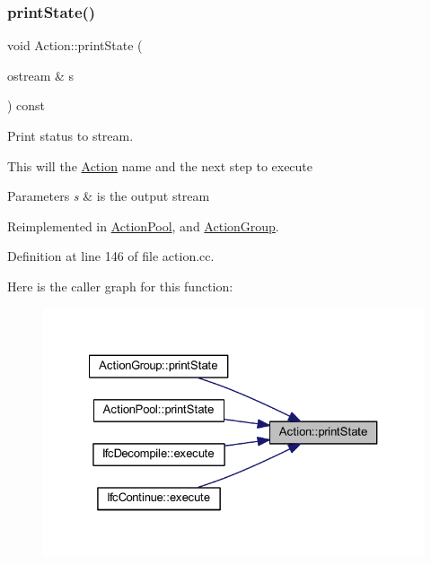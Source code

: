 \subsubsection{\texorpdfstring{printState()}{printState()}}
{\footnotesize\ttfamily void Action\+::print\+State (\begin{DoxyParamCaption}\item[{ostream \&}]{s }\end{DoxyParamCaption}) const\hspace{0.3cm}{\ttfamily [virtual]}}



Print status to stream. 

This will the \mbox{\hyperlink{class_action}{Action}} name and the next step to execute 
\begin{DoxyParams}{Parameters}
{\em s} & is the output stream \\
\hline
\end{DoxyParams}


Reimplemented in \mbox{\hyperlink{class_action_pool_ac3301606be4afd36584109196c71e2ed}{Action\+Pool}}, and \mbox{\hyperlink{class_action_group_af5e07efb4a443cd74b57083a0fd57c02}{Action\+Group}}.



Definition at line 146 of file action.\+cc.

Here is the caller graph for this function\+:
\nopagebreak
\begin{figure}[H]
\begin{center}
\leavevmode
\includegraphics[width=327pt]{class_action_a8c64348dc5e9ad6ba914cf74aaac8bfb_icgraph}
\end{center}
\end{figure}
\mbox{\label{class_action_a57e38931fcb3bf9dffac2946d5e790be}} 

